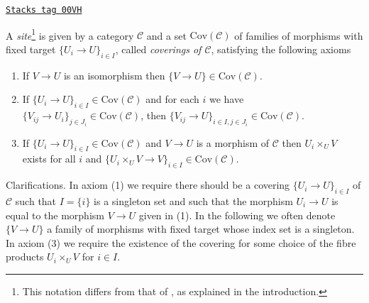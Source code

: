 \begin{definition}[Site]
\label{sites-definition-site}
\href{https://stacks.math.columbia.edu/tag/00VH}{\texttt{Stacks tag 00VH}}

A {\it site}\footnote{This notation differs from that of \cite{SGA4}, as
explained in the introduction.} is given by a category $\mathcal{C}$ and a set
$\text{Cov}(\mathcal{C})$ of families of morphisms with fixed target
$\{U_i \to U\}_{i \in I}$, called {\it coverings of $\mathcal{C}$},
satisfying the following axioms
\begin{enumerate}
\item If $V \to U$ is an isomorphism then $\{V \to U\} \in
\text{Cov}(\mathcal{C})$.
\item If $\{U_i \to U\}_{i\in I} \in \text{Cov}(\mathcal{C})$ and for each
$i$ we have $\{V_{ij} \to U_i\}_{j\in J_i} \in \text{Cov}(\mathcal{C})$, then
$\{V_{ij} \to U\}_{i \in I, j\in J_i} \in \text{Cov}(\mathcal{C})$.
\item If $\{U_i \to U\}_{i\in I}\in \text{Cov}(\mathcal{C})$
and $V \to U$ is a morphism of $\mathcal{C}$ then $U_i \times_U V$
exists for all $i$ and
$\{U_i \times_U V \to V \}_{i\in I} \in \text{Cov}(\mathcal{C})$.
\end{enumerate}
\end{definition}

Clarifications. In axiom (1) we require there should be a covering
$\{U_i \to U\}_{i \in I}$ of $\mathcal{C}$ such that $I = \{i\}$
is a singleton set and such that the morphism $U_i \to U$ is equal to
the morphism $V \to U$ given in (1). In the following we often denote
$\{V \to U\}$ a family of morphisms with fixed target whose index set
is a singleton. In axiom (3) we require the existence of the covering
for some choice of the fibre products $U_i \times_U V$ for $i \in I$.


